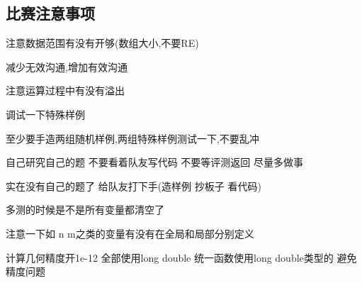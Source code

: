 \documentclass[a4paper, fontset=none]{ctexart}
\begin{document}
\subsection{比赛注意事项}

注意数据范围有没有开够(数组大小,不要RE)

减少无效沟通,增加有效沟通

注意运算过程中有没有溢出

调试一下特殊样例

至少要手造两组随机样例,两组特殊样例测试一下,不要乱冲

自己研究自己的题 不要看着队友写代码 不要等评测返回 尽量多做事

实在没有自己的题了 给队友打下手(造样例 抄板子 看代码)

多测的时候是不是所有变量都清空了

注意一下如 n m之类的变量有没有在全局和局部分别定义

计算几何精度开1e-12 全部使用long double 统一函数使用long double类型的 避免精度问题
\end{document}
